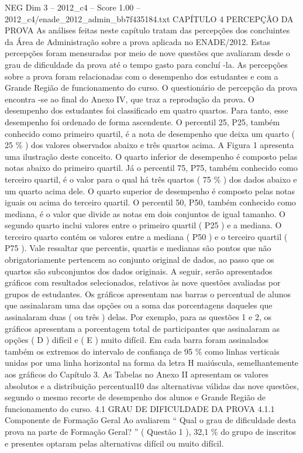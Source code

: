\begin{textsample}{NEG Dim 3 – 2012\_c4 – Score 1.00 – 2012\_c4/enade\_2012\_admin\_bb7f435184.txt}  \label{ex:f3_neg_133}
CAPÍTULO 4 PERCEPÇÃO DA PROVA As análises feitas neste capítulo tratam das percepções dos concluintes da Área de Administração sobre a prova aplicada no ENADE/2012.
Estas percepções foram mensuradas por meio de nove questões que avaliaram desde o grau de dificuldade da prova até o tempo gasto para concluí -la.
As percepções sobre a prova foram relacionadas com o desempenho dos estudantes e com a Grande Região de funcionamento do curso.
O questionário de percepção da prova encontra -se ao final do Anexo IV, que traz a reprodução da prova.
O desempenho dos estudantes foi classificado em quatro quartos.
Para tanto, esse desempenho foi ordenado de forma ascendente.
O percentil 25, P25, também conhecido como primeiro quartil, é a nota de desempenho que deixa um quarto ( 25 \% ) dos valores observados abaixo e três quartos acima.
A Figura 1 apresenta uma ilustração deste conceito.
O quarto inferior de desempenho é composto pelas notas abaixo do primeiro quartil.
Já o percentil 75, P75, também conhecido como terceiro quartil, é o valor para o qual há três quartos ( 75 \% ) dos dados abaixo e um quarto acima dele.
O quarto superior de desempenho é composto pelas notas iguais ou acima do terceiro quartil.
O percentil 50, P50, também conhecido como mediana, é o valor que divide as notas em dois conjuntos de igual tamanho.
O segundo quarto inclui valores entre o primeiro quartil ( P25 ) e a mediana.
O terceiro quarto contém os valores entre a mediana ( P50 ) e o terceiro quartil ( P75 ).
Vale ressaltar que percentis, quartis e medianas são pontos que não obrigatoriamente pertencem ao conjunto original de dados, ao passo que os quartos são subconjuntos dos dados originais.
A seguir, serão apresentados gráficos com resultados selecionados, relativos às nove questões avaliadas por grupos de estudantes.
Os gráficos apresentam nas barras o percentual de alunos que assinalaram uma das opções ou a soma das porcentagens daqueles que assinalaram duas ( ou três ) delas.
Por exemplo, para as questões 1 e 2, os gráficos apresentam a porcentagem total de participantes que assinalaram as opções ( D ) difícil e ( E ) muito difícil.
Em cada barra foram assinalados também os extremos do intervalo de confiança de 95 \% como linhas verticais unidas por uma linha horizontal na forma da letra H maiúscula, semelhantemente aos gráficos do Capítulo 3.
As Tabelas no Anexo II apresentam os valores absolutos e a distribuição percentual10 das alternativas válidas das nove questões, segundo o mesmo recorte de desempenho dos alunos e Grande Região de funcionamento do curso. 4.1 GRAU DE DIFICULDADE DA PROVA 4.1.1 Componente de Formação Geral Ao avaliarem “ Qual o grau de dificuldade desta prova na parte de Formação Geral? ” ( Questão 1 ), 32,1 \% do grupo de inscritos e presentes optaram pelas alternativas difícil ou muito difícil.

\end{textsample}
